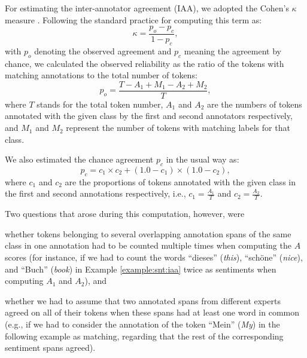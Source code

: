 For estimating the inter-annotator agreement (IAA), we adopted the
Cohen's $\kappa$ measure \cite{Cohen:60}.  Following the standard
practice for computing this term as:
\begin{equation*}
  \kappa = \frac{p_o - p_c}{1 - p_c},
\end{equation*}
with $p_o$ denoting the observed agreement and $p_c$ meaning the
agreement by chance, we calculated the observed reliability as the
ratio of the tokens with matching annotations to the total number of
tokens:
\begin{equation*}
  p_o = \frac{T - A_1 + M_1 - A_2 + M_2}{T},
\end{equation*}
where $T$ stands for the total token number, $A_1$ and $A_2$ are the
numbers of tokens annotated with the given class by the first and
second annotators respectively, and $M_1$ and $M_2$ represent the
number of tokens with matching labels for that class.

We also estimated the chance agreement $p_c$ in the usual way as:
\begin{equation*}\textstyle
  p_c = c_1 \times c_2 + (1.0 - c_1) \times (1.0 - c_2),
\end{equation*}
where $c_1$ and $c_2$ are the proportions of tokens annotated with the
given class in the first and second annotations respectively, i.e.,
$c_1 = \frac{A_1}{T}$ and $c_2 = \frac{A_2}{T}$.

Two questions that arose during this computation, however, were
\begin{inparaenum}
  \item whether tokens belonging to several overlapping annotation
    spans of the same class in one annotation had to be counted
    multiple times when computing the $A$ scores (for instance, if we
    had to count the words ``dieses'' (\textit{this}), ``sch\"one''
    (\textit{nice}), and ``Buch'' (\textit{book}) in Example
    \ref{example:snt:iaa} twice as sentiments when computing $A_1$ and
    $A_2$), and
  \item whether we had to assume that two annotated spans from
    different experts agreed on all of their tokens when these spans
    had at least one word in common (e.g., if we had to consider the
    annotation of the token ``Mein'' (\textit{My}) in the following
    example as matching, regarding that the rest of the corresponding
    sentiment spans agreed).
\end{inparaenum}


